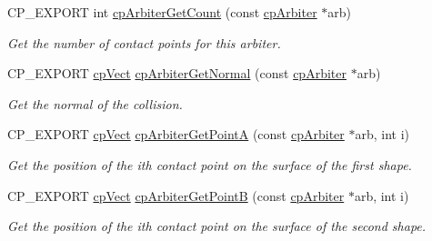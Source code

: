 \begin{DoxyCompactItemize}
\mbox{\label{group__cpArbiter_ga166184f2b2ce68a734e380e702763404}} 
C\+P\+\_\+\+E\+X\+P\+O\+RT int \hyperlink{group__cpArbiter_ga166184f2b2ce68a734e380e702763404}{cp\+Arbiter\+Get\+Count} (const \hyperlink{structcpArbiter}{cp\+Arbiter} $\ast$arb)
\begin{DoxyCompactList}\small\item\em Get the number of contact points for this arbiter. \end{DoxyCompactList}\item 
\mbox{\label{group__cpArbiter_gaf433a0a6809f8366530adfb6538a1a1b}} 
C\+P\+\_\+\+E\+X\+P\+O\+RT \hyperlink{structcpVect}{cp\+Vect} \hyperlink{group__cpArbiter_gaf433a0a6809f8366530adfb6538a1a1b}{cp\+Arbiter\+Get\+Normal} (const \hyperlink{structcpArbiter}{cp\+Arbiter} $\ast$arb)
\begin{DoxyCompactList}\small\item\em Get the normal of the collision. \end{DoxyCompactList}\item 
\mbox{\label{group__cpArbiter_ga0c822e1157a0b5e3e95d3de5866f5af1}} 
C\+P\+\_\+\+E\+X\+P\+O\+RT \hyperlink{structcpVect}{cp\+Vect} \hyperlink{group__cpArbiter_ga0c822e1157a0b5e3e95d3de5866f5af1}{cp\+Arbiter\+Get\+PointA} (const \hyperlink{structcpArbiter}{cp\+Arbiter} $\ast$arb, int i)
\begin{DoxyCompactList}\small\item\em Get the position of the {\ttfamily ith} contact point on the surface of the first shape. \end{DoxyCompactList}\item 
\mbox{\label{group__cpArbiter_ga5f52d875b680592bc657c4ef4608a3c4}} 
C\+P\+\_\+\+E\+X\+P\+O\+RT \hyperlink{structcpVect}{cp\+Vect} \hyperlink{group__cpArbiter_ga5f52d875b680592bc657c4ef4608a3c4}{cp\+Arbiter\+Get\+PointB} (const \hyperlink{structcpArbiter}{cp\+Arbiter} $\ast$arb, int i)
\begin{DoxyCompactList}\small\item\em Get the position of the {\ttfamily ith} contact point on the surface of the second shape. \end{DoxyCompactList}\item 
\mbox{\label{group__cpArbiter_ga7946b026663db9e03cacefb655369cd8}} 

\end{DoxyCompactItemize}
